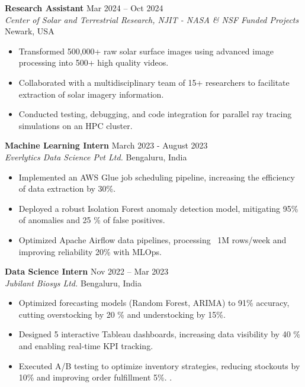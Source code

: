 \documentclass[10pt, a4paper]{article}
\begin{document}
\textbf{Research Assistant} \hfill Mar 2024 – Oct 2024 \\
\textit{Center of Solar and Terrestrial Research, NJIT - NASA \& NSF Funded Projects} \hfill Newark, USA
\begin{itemize}
    \item Transformed 500,000+ raw solar surface images using advanced image processing into 500+ high quality videos.
    \item Collaborated with a multidisciplinary team of 15+ researchers to facilitate extraction of solar imagery information. 
    \item Conducted testing, debugging, and code integration for parallel ray tracing simulations on an HPC cluster. 
\end{itemize}
\vspace{2pt} %

\textbf{Machine Learning Intern} \hfill March 2023 - August 2023 \\
\textit{Everlytics Data Science Pvt Ltd.} \hfill Bengaluru, India
\begin{itemize}
    \item Implemented an AWS Glue job scheduling pipeline, increasing the efficiency of data extraction by 30\%.
    \item Deployed a robust Isolation Forest anomaly detection model, mitigating 95\% of anomalies and 25 \% of false positives. 
    \item Optimized Apache Airflow data pipelines, processing ~1M rows/week and improving reliability 20\% with MLOps. 
\end{itemize}
\vspace{2pt} %

\textbf{Data Science Intern} \hfill Nov 2022 – Mar 2023 \\
\textit{Jubilant Biosys Ltd.} \hfill Bengaluru, India
\begin{itemize}
    \item Optimized forecasting models (Random Forest, ARIMA) to 91\% accuracy, cutting overstocking by 20 \% and understocking by 15\%.
    \item Designed 5 interactive Tableau dashboards, increasing data visibility by 40 \% and enabling real-time KPI tracking. 
    \item Executed A/B testing to optimize inventory strategies, reducing stockouts by 10\% and improving order fulfillment 5\%. . 
\end{itemize}
\end{document}
